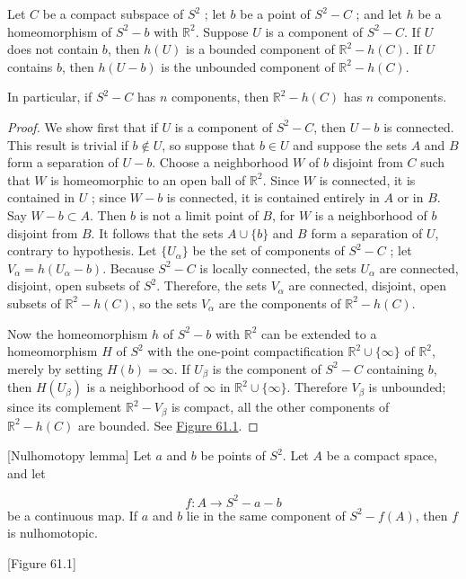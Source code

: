 \begin{lemma}
\label{lem:\thetheorem}
Let \(C\) be a compact subspace of \(S^{2}\) ; let \(b\) be a point of \(S^{2} - C\) ; and let \(h\) be a homeomorphism of \(S^{2} - b\) with \(\mathbb{R}^{2}\). Suppose \(U\) is a component of \(S^{2} - C\). If \(U\) does not contain \(b\), then \(h( U)\) is a bounded component of \(\mathbb{R}^{2} - h( C)\). If \(U\) contains \(b\), then \(h( {U - b})\) is the unbounded component of \(\mathbb{R}^{2} - h( C)\).
\end{lemma}

In particular, if \(S^{2} - C\) has \(n\) components, then \(\mathbb{R}^{2} - h( C)\) has \(n\) components.

\begin{proof}
We show first that if \(U\) is a component of \(S^{2} - C\), then \(U - b\) is connected. This result is trivial if \(b \notin U\), so suppose that \(b \in U\) and suppose the sets \(A\) and \(B\) form a separation of \(U - b\). Choose a neighborhood \(W\) of \(b\) disjoint from \(C\) such that \(W\) is homeomorphic to an open ball of \(\mathbb{R}^{2}\). Since \(W\) is connected, it is contained in \(U\) ; since \(W - b\) is connected, it is contained entirely in \(A\) or in \(B\). Say \(W - b \subset A\). Then \(b\) is not a limit point of \(B\), for \(W\) is a neighborhood of \(b\) disjoint from \(B\). It follows that the sets \(A \cup \{ b\}\) and \(B\) form a separation of \(U\), contrary to hypothesis.
Let \(\{ U_{\alpha }\}\) be the set of components of \(S^{2} - C\) ; let \(V_{\alpha } = h( {U_{\alpha } - b})\). Because \(S^{2} - C\) is locally connected, the sets \(U_{\alpha }\) are connected, disjoint, open subsets of \(S^{2}\). Therefore, the sets \(V_{\alpha }\) are connected, disjoint, open subsets of \(\mathbb{R}^{2} - h( C)\), so the sets \(V_{\alpha }\) are the components of \(\mathbb{R}^{2} - h( C)\).

Now the homeomorphism \(h\) of \(S^{2} - b\) with \(\mathbb{R}^{2}\) can be extended to a homeomorphism \(H\) of \(S^{2}\) with the one-point compactification \(\mathbb{R}^{2} \cup \{ \infty \}\) of \(\mathbb{R}^{2}\), merely by setting \(H( b) = \infty\). If \(U_{\beta }\) is the component of \(S^{2} - C\) containing \(b\), then \(H( U_{\beta })\) is a neighborhood of \(\infty\) in \(\mathbb{R}^{2} \cup \{ \infty \}\). Therefore \(V_{\beta }\) is unbounded; since its complement \(\mathbb{R}^{2} - V_{\beta }\) is compact, all the other components of \(\mathbb{R}^{2} - h( C)\) are bounded. See \hyperref[fig:61.1]{Figure 61.1}.
\end{proof}
\begin{lemma}
\label{lem:\thetheorem}[Nulhomotopy lemma]
Let \(a\) and \(b\) be points of \(S^{2}\). Let \(A\) be a compact space, and let

\[
f : A \rightarrow {S}^{2} - a - b
\]
be a continuous map. If \(a\) and \(b\) lie in the same component of \(S^{2} - f( A)\), then \(f\) is nulhomotopic.

[Figure 61.1]
\end{lemma}

